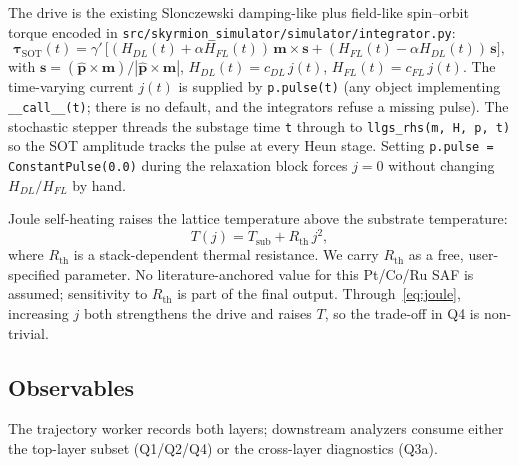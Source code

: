 \documentclass[11pt,a4paper]{article}
\newcommand{\mb}[1]{\mathbf{#1}}
\newcommand{\Rth}{R_{\text{th}}}
\newcommand{\jcur}{j}
\begin{document}
The drive is the existing Slonczewski damping-like plus field-like
spin--orbit torque encoded in \texttt{src/skyrmion\_simulator/simulator/integrator.py}:
%
\begin{equation}
\bm{\tau}_{\text{SOT}}(t) =
\gamma'\, \big[ (H_{DL}(t) + \alpha H_{FL}(t))\, \mb{m} \times \mb{s}
+ (H_{FL}(t) - \alpha H_{DL}(t))\, \mb{s} \big],
\end{equation}
%
with $\mb{s} = (\hat{\mb{p}} \times \mb{m})/|\hat{\mb{p}} \times \mb{m}|$,
$H_{DL}(t) = c_{DL}\, \jcur(t)$, $H_{FL}(t) = c_{FL}\, \jcur(t)$.
The time-varying current $\jcur(t)$ is supplied by
\texttt{p.pulse(t)} (any object implementing \texttt{\_\_call\_\_(t)};
there is no default, and the integrators refuse a missing pulse). The
stochastic
stepper threads the substage time \texttt{t} through to
\texttt{llgs\_rhs(m, H, p, t)} so the SOT amplitude tracks the pulse
at every Heun stage. Setting \texttt{p.pulse = ConstantPulse(0.0)}
during the relaxation block forces $\jcur = 0$ without changing
$H_{DL}/H_{FL}$ by hand.

Joule self-heating raises the lattice temperature above the substrate
temperature:
%
\begin{equation}\label{eq:joule}
T(\jcur) = T_{\text{sub}} + \Rth\, \jcur^2,
\end{equation}
%
where $\Rth$ is a stack-dependent thermal resistance. We carry $\Rth$
as a free, user-specified parameter. No literature-anchored value for
this Pt/Co/Ru SAF is assumed; sensitivity to $\Rth$ is part of the
final output. Through~\eqref{eq:joule}, increasing $\jcur$ both
strengthens the drive and raises $T$, so the trade-off in Q4 is
non-trivial.

\subsection{Observables}

The trajectory worker records both layers; downstream analyzers
consume either the top-layer subset (Q1/Q2/Q4) or the cross-layer
diagnostics (Q3a).
\end{document}
